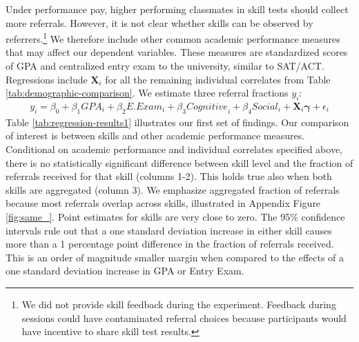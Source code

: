 \documentclass[11pt,a4paper,oneside]{article}
\begin{document}
Under performance pay, higher performing classmates in skill tests should collect more referrals. However, it is not clear whether skills can be observed by referrers.\footnote{We did not provide skill feedback during the experiment. Feedback during sessions could have contaminated referral choices because participants would have incentive to share skill test results.} We therefore include other common academic performance measures that may affect our dependent variables. These measures are standardized scores of GPA and centralized entry exam to the university, similar to SAT/ACT. Regressions include $\mathbf{X}_{i}$ for all the remaining individual correlates from Table \ref{tab:demographic-comparison}. We estimate three referral fractions $y_{i}$: 
\begin{multline}
    y_{i} = \beta_0 + \beta_1{GPA}_{i} + \beta_2{E.Exam}_{i} + \beta_3{Cognitive}_{i} + \beta_4{Social}_{i} + \mathbf{X}_{i}\boldsymbol{\gamma} + \epsilon_{i}    
\end{multline}
Table \ref{tab:regression-results1} illustrates our first set of findings. Our comparison of interest is between skills and other academic performance measures. Conditional on academic performance and individual correlates specified above, there is no statistically significant difference between skill level and the fraction of referrals received for that skill (columns 1-2). This holds true also when both skills are aggregated (column 3). We emphasize aggregated fraction of referrals because most referrals overlap across skills, illustrated in Appendix Figure \ref{fig:same_}. Point estimates for skills are very close to zero. The 95\% confidence intervals rule out that a one standard deviation increase in either skill causes more than a 1 percentage point difference in the fraction of referrals received. This is an order of magnitude smaller margin when compared to the effects of a one standard deviation increase in GPA or Entry Exam. 
\end{document}
